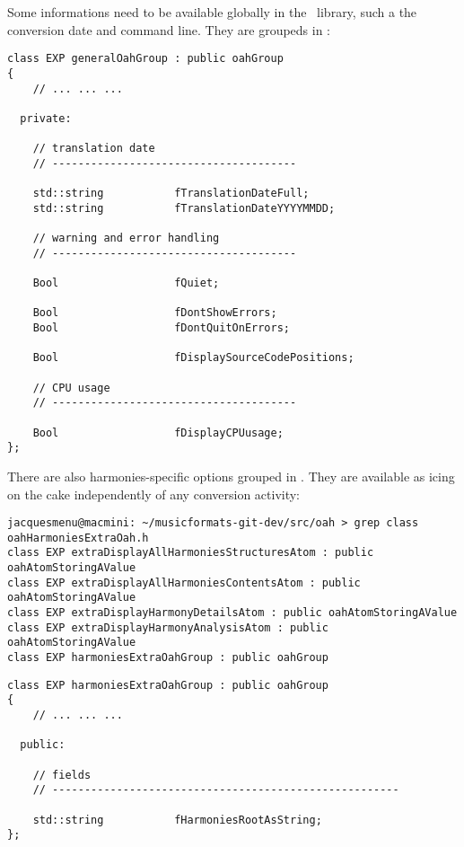 Some informations need to be available globally in the \mf\ library, such a the conversion date and command line. They are groupeds in :
\begin{lstlisting}[language=CPlusPlus]
class EXP generalOahGroup : public oahGroup
{
	// ... ... ...

  private:

    // translation date
    // --------------------------------------

    std::string           fTranslationDateFull;
    std::string           fTranslationDateYYYYMMDD;

    // warning and error handling
    // --------------------------------------

    Bool                  fQuiet;

    Bool                  fDontShowErrors;
    Bool                  fDontQuitOnErrors;

    Bool                  fDisplaySourceCodePositions;

    // CPU usage
    // --------------------------------------

    Bool                  fDisplayCPUusage;
};
\end{lstlisting}

There are also harmonies-specific options grouped in . They are available as icing on the cake independently of any conversion activity:
\begin{lstlisting}[language=Terminal]
jacquesmenu@macmini: ~/musicformats-git-dev/src/oah > grep class   oahHarmoniesExtraOah.h
class EXP extraDisplayAllHarmoniesStructuresAtom : public oahAtomStoringAValue
class EXP extraDisplayAllHarmoniesContentsAtom : public oahAtomStoringAValue
class EXP extraDisplayHarmonyDetailsAtom : public oahAtomStoringAValue
class EXP extraDisplayHarmonyAnalysisAtom : public oahAtomStoringAValue
class EXP harmoniesExtraOahGroup : public oahGroup
\end{lstlisting}

\begin{lstlisting}[language=CPlusPlus]
class EXP harmoniesExtraOahGroup : public oahGroup
{
 	// ... ... ...

  public:

    // fields
    // ------------------------------------------------------

    std::string           fHarmoniesRootAsString;
};
\end{lstlisting}


